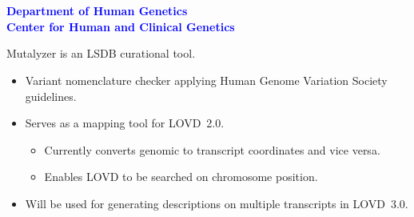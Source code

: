 \documentclass[a4, portrait]{seminar}
\begin{document}

\begin{slide}
\setcounter{slide}{0}
\vspace*{1.5cm}
\begin{center}
{\bf\Large{\myTitle}}\\
\vfill
\textcolor{Blue}{
  {\bf
    \small{\me}\\
    \small{Department of Human Genetics}\\
    \small{Center for Human and Clinical Genetics}
  }
}
\vspace{1.1cm}
\end{center}
\end{slide}



\begin{slide}

Mutalyzer is an LSDB curational tool.

\vspace{.5cm}
\begin{itemize}
  \item Variant nomenclature checker applying Human Genome Variation Society
        guidelines.
  \item Serves as a mapping tool for LOVD~2.0.
  \begin{itemize}
    \item Currently converts genomic to transcript coordinates and vice versa.
    \item Enables LOVD to be searched on chromosome position.
  \end{itemize}
  \item Will be used for generating descriptions on multiple transcripts in 
        LOVD~3.0.
\end{itemize}
\vfill
\end{slide}
\end{document}
